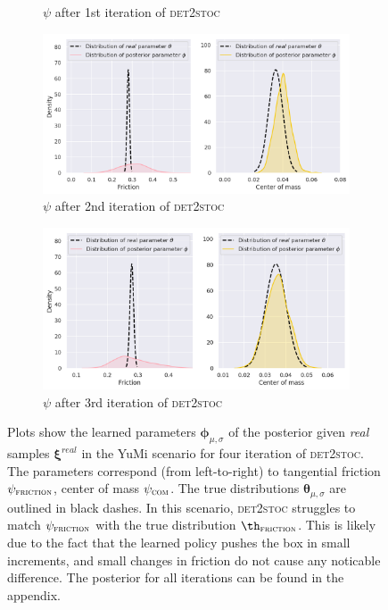 \documentclass{kththesis}
\newcommand{\vth}{\boldsymbol{\theta}}
\newcommand{\vph}{\boldsymbol{\phi}}
\renewcommand{\vec}[1]{\boldsymbol{#1}}
\newcommand{\dettostoc}{\textsc{det2stoc}}
\newcommand{\pfriction}{\psi_{\textsc{friction}}}
\newcommand{\pcom}{\psi_{\textsc{com}}}
\begin{document}
\begin{figure}
\begin{subfigure}{0.45\textwidth}
  \caption{$\psi$ after 1st iteration of \dettostoc{}}
\end{subfigure}
\begin{subfigure}{0.45\textwidth}
  \centering
  \includegraphics[width=\linewidth]{img/yumi/latent-representation/yumi_latent_encoding_2_iter}
  \caption{$\psi$ after 2nd iteration of \dettostoc{}}
\end{subfigure}
\begin{subfigure}{0.45\textwidth}
  \centering
  \includegraphics[width=\linewidth]{img/yumi/latent-representation/yumi_latent_encoding_3_iter}
  \caption{$\psi$ after 3rd iteration of \dettostoc{}}
\end{subfigure}
\caption{Plots show the learned parameters $\vph_{\mu, \sigma}$ of the posterior given \emph{real} samples $\vec{\xi}^{real}$ in the YuMi scenario for four iteration of \dettostoc{}.
The parameters correspond (from left-to-right) to tangential friction $\pfriction$, center of mass $\pcom$. The true distributions $\vth_{\mu, \sigma}$ are outlined in black dashes. In this scenario, \dettostoc{} struggles to match $\pfriction{}$ with the true distribution $\th_\textsc{friction}$. This is likely due to the fact that the learned policy pushes the box in small increments, and small changes in friction do not cause any noticable difference. The posterior for all iterations can be found in the appendix.}
\label{fig:yumi_latent_space_full}
\end{figure}
\end{document}
